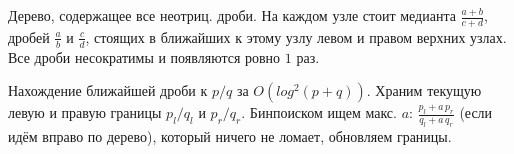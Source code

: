 Дерево, содержащее все неотриц. дроби. На каждом узле стоит медианта $\frac{a + b}{c + d}$, дробей $\frac{a}{b}$ и $\frac{c}{d}$, стоящих в ближайших к этому узлу левом и правом верхних узлах. Все дроби несократимы и появляются ровно $1$ раз.

Нахождение ближайшей дроби к $p / q$ за $O(log^2(p + q))$. Храним текущую левую и правую границы $p_l / q_l$ и $p_r / q_r$.
Бинпоиском ищем макс. $a$: $\frac{p_l + a\,p_r}{q_l + a\,q_r}$ (если идём вправо по дерево), который ничего не ломает, обновляем границы.
